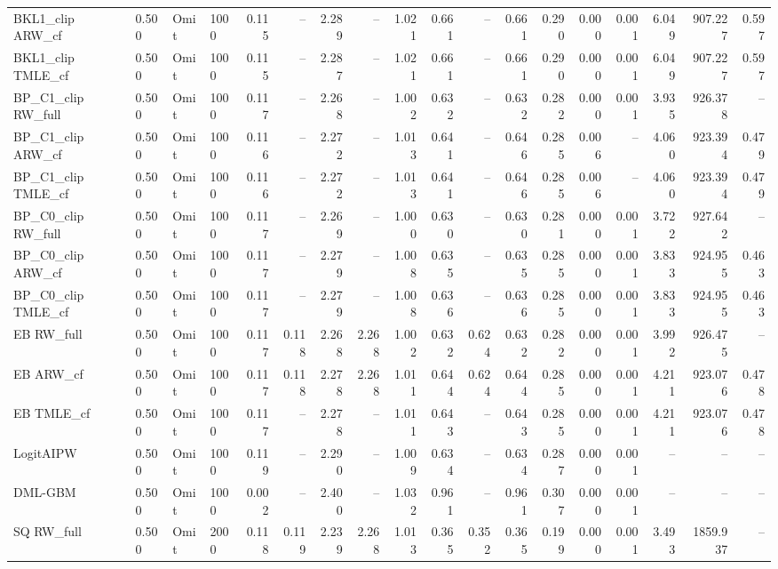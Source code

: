 \begin{tabular}{llllrrrrrrrrrrrrrr}
BKL1\_clip ARW\_cf & 0.500 & Omit & 1000 & 0.115 & -- & 2.289 & -- & 1.021 & 0.661 & -- & 0.661 & 0.290 & 0.000 & 0.001 & 6.049 & 907.227 & 0.597 \\
BKL1\_clip TMLE\_cf & 0.500 & Omit & 1000 & 0.115 & -- & 2.287 & -- & 1.021 & 0.661 & -- & 0.661 & 0.290 & 0.000 & 0.001 & 6.049 & 907.227 & 0.597 \\
BP\_C1\_clip RW\_full & 0.500 & Omit & 1000 & 0.117 & -- & 2.268 & -- & 1.002 & 0.632 & -- & 0.632 & 0.282 & 0.000 & 0.001 & 3.935 & 926.378 & -- \\
BP\_C1\_clip ARW\_cf & 0.500 & Omit & 1000 & 0.116 & -- & 2.272 & -- & 1.013 & 0.641 & -- & 0.646 & 0.285 & 0.006 & -- & 4.060 & 923.394 & 0.479 \\
BP\_C1\_clip TMLE\_cf & 0.500 & Omit & 1000 & 0.116 & -- & 2.272 & -- & 1.013 & 0.641 & -- & 0.646 & 0.285 & 0.006 & -- & 4.060 & 923.394 & 0.479 \\
BP\_C0\_clip RW\_full & 0.500 & Omit & 1000 & 0.117 & -- & 2.269 & -- & 1.000 & 0.630 & -- & 0.630 & 0.281 & 0.000 & 0.001 & 3.722 & 927.642 & -- \\
BP\_C0\_clip ARW\_cf & 0.500 & Omit & 1000 & 0.117 & -- & 2.279 & -- & 1.008 & 0.635 & -- & 0.635 & 0.285 & 0.000 & 0.001 & 3.833 & 924.955 & 0.463 \\
BP\_C0\_clip TMLE\_cf & 0.500 & Omit & 1000 & 0.117 & -- & 2.279 & -- & 1.008 & 0.636 & -- & 0.636 & 0.285 & 0.000 & 0.001 & 3.833 & 924.955 & 0.463 \\
EB RW\_full & 0.500 & Omit & 1000 & 0.117 & 0.118 & 2.268 & 2.268 & 1.002 & 0.632 & 0.624 & 0.632 & 0.282 & 0.000 & 0.001 & 3.992 & 926.475 & -- \\
EB ARW\_cf & 0.500 & Omit & 1000 & 0.117 & 0.118 & 2.278 & 2.268 & 1.011 & 0.644 & 0.624 & 0.644 & 0.285 & 0.000 & 0.001 & 4.211 & 923.076 & 0.478 \\
EB TMLE\_cf & 0.500 & Omit & 1000 & 0.117 & -- & 2.278 & -- & 1.011 & 0.643 & -- & 0.643 & 0.285 & 0.000 & 0.001 & 4.211 & 923.076 & 0.478 \\
LogitAIPW & 0.500 & Omit & 1000 & 0.119 & -- & 2.290 & -- & 1.009 & 0.634 & -- & 0.634 & 0.287 & 0.000 & 0.001 & -- & -- & -- \\
DML-GBM & 0.500 & Omit & 1000 & 0.002 & -- & 2.400 & -- & 1.032 & 0.961 & -- & 0.961 & 0.307 & 0.000 & 0.001 & -- & -- & -- \\
SQ RW\_full & 0.500 & Omit & 2000 & 0.118 & 0.119 & 2.239 & 2.268 & 1.013 & 0.365 & 0.352 & 0.365 & 0.199 & 0.000 & 0.001 & 3.493 & 1859.937 & -- \\

\end{tabular}

